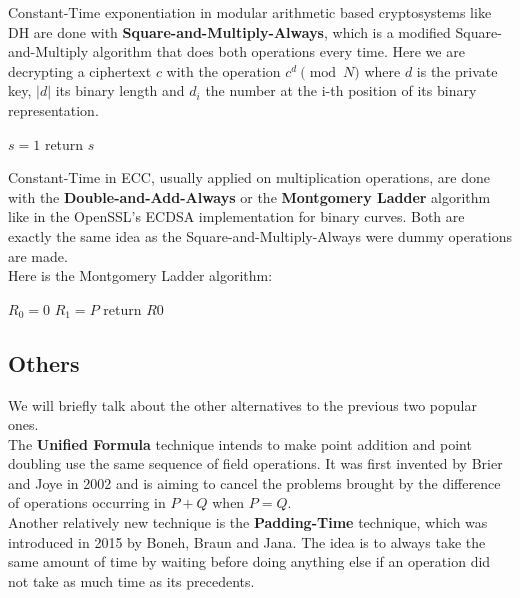 \documentclass[a4paper,11pt]{article}
\begin{document}
Constant-Time exponentiation in modular arithmetic based cryptosystems like DH are done with \textbf{Square-and-Multiply-Always}, which is a modified Square-and-Multiply algorithm that does both operations every time. Here we are decrypting a ciphertext $c$ with the operation $c^d \pmod{N}$ where $d$ is the private key, $|d|$ its binary length and $d_i$ the number at the i-th position of its binary representation.

\DontPrintSemicolon
\begin{algorithm}[H]
    $s = 1$\;
    return $s$\;
\end{algorithm}

Constant-Time in ECC, usually applied on multiplication operations, are done with the \textbf{Double-and-Add-Always} or the \textbf{Montgomery Ladder} algorithm like in the OpenSSL's ECDSA implementation for binary curves. Both are exactly the same idea as the Square-and-Multiply-Always were dummy operations are made.\\
Here is the Montgomery Ladder algorithm:

\begin{algorithm}[H]
    $R_0 = 0$\;
    $R_1 = P$\;
    return $R0$\;
\end{algorithm}

\subsection{Others}

We will briefly talk about the other alternatives to the previous two popular ones.\\

The \textbf{Unified Formula} technique intends to make point addition and point doubling use the same sequence of field operations. It was first invented by Brier and Joye in 2002\cite{unified} and is aiming to cancel the problems brought by the difference of operations occurring in $P + Q$ when $P = Q$.\\

Another relatively new technique is the \textbf{Padding-Time} technique, which was introduced in 2015 by Boneh, Braun and Jana. The idea is to always take the same amount of time by waiting before doing anything else if an operation did not take as much time as its precedents.\\
\end{document}
